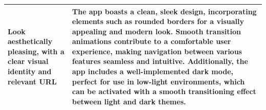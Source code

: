 \documentclass[a4paper]{article}
\begin{document}
{\begin{tabular}{|p{0.25\linewidth}|p{0.75\linewidth}|}
\hline
Look aesthetically pleasing, with a clear visual identity and relevant URL & The app boasts a clean, sleek design, incorporating elements such as rounded borders for a visually appealing and modern look. Smooth transition animations contribute to a comfortable user experience, making navigation between various features seamless and intuitive. Additionally, the app includes a well-implemented dark mode, perfect for use in low-light environments, which can be activated with a smooth transitioning effect between light and dark themes.\\
\hline
\end{tabular}}
\end{document}
